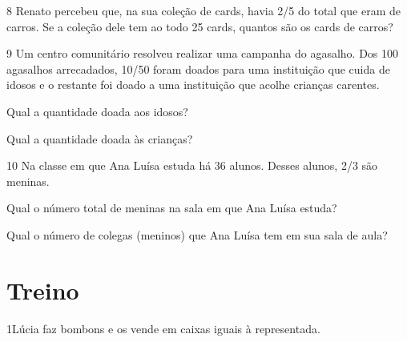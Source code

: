 
\pagebreak
\num{8} Renato percebeu que, na sua coleção de cards, havia 2/5 do total que eram de carros. Se a coleção dele tem ao todo 25 cards,
quantos são os cards de carros?



\bigskip
\bigskip
\bigskip

\num{9} Um centro comunitário resolveu realizar uma campanha do agasalho.
Dos 100 agasalhos arrecadados, 10/50 foram doados para uma instituição
que cuida de idosos e o restante foi doado a uma instituição que acolhe
crianças carentes.

\begin{escolha}
\item
  Qual a quantidade doada aos idosos?

\bigskip
\bigskip

\item
  Qual a quantidade doada às crianças?

\bigskip
\bigskip
\end{escolha}

\num{10} Na classe em que Ana Luísa estuda há 36 alunos. Desses alunos, 2/3 são meninas.

\begin{escolha}
\item
  Qual o número total de meninas na sala em que Ana Luísa estuda?

\bigskip
\bigskip

\item
  Qual o número de colegas (meninos) que Ana Luísa tem em sua sala de aula?

\bigskip
\bigskip
\end{escolha}

\pagebreak
\section*{Treino}

\num{1}Lúcia faz bombons e os vende em caixas iguais à representada.

